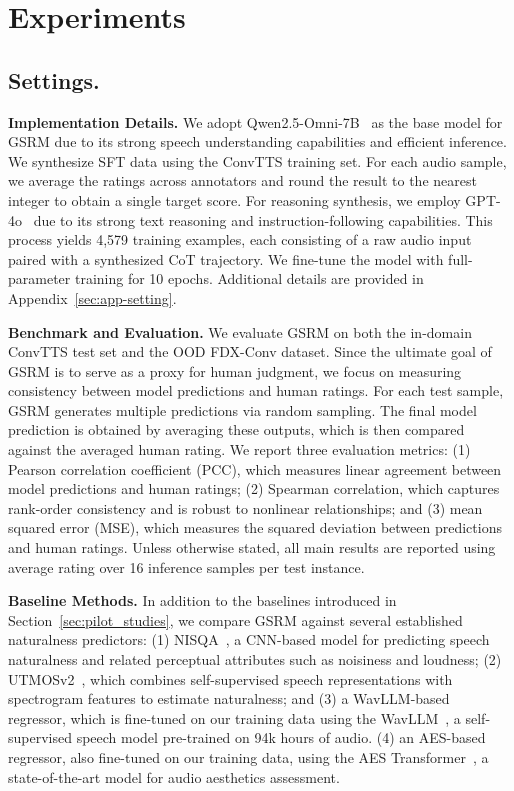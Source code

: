 \section{Experiments} 

\subsection{Settings.} \label{sec:exp_setting}
\textbf{Implementation Details.} We adopt Qwen2.5-Omni-7B~\cite{xu2025qwen2} as the base model for GSRM due to its strong speech understanding capabilities and efficient inference. We synthesize SFT data using the ConvTTS training set. For each audio sample, we average the ratings across annotators and round the result to the nearest integer to obtain a single target score. For reasoning synthesis, we employ GPT-4o~\cite{hurst2024gpt} due to its strong text reasoning and instruction-following capabilities. This process yields 4,579 training examples, each consisting of a raw audio input paired with a synthesized CoT trajectory. We fine-tune the model with full-parameter training for 10 epochs. Additional details are provided in Appendix~\ref{sec:app-setting}.


\textbf{Benchmark and Evaluation.} We evaluate GSRM on both the in-domain ConvTTS test set and the OOD FDX-Conv dataset. Since the ultimate goal of GSRM is to serve as a proxy for human judgment, we focus on measuring consistency between model predictions and human ratings. For each test sample, GSRM generates multiple predictions via random sampling. The final model prediction is obtained by averaging these outputs, which is then compared against the averaged human rating. We report three evaluation metrics: (1) Pearson correlation coefficient (PCC), which measures linear agreement between model predictions and human ratings; (2) Spearman correlation, which captures rank-order consistency and is robust to nonlinear relationships; and (3) mean squared error (MSE), which measures the squared deviation between predictions and human ratings. Unless otherwise stated, all main results are reported using average rating over 16 inference samples per test instance.

\textbf{Baseline Methods.}
In addition to the baselines introduced in Section~\ref{sec:pilot_studies}, we compare GSRM against several established naturalness predictors: (1) NISQA~\cite{mittag2021nisqa}, a CNN-based model for predicting speech naturalness and related perceptual attributes such as noisiness and loudness; (2) UTMOSv2~\cite{baba2024utmosv2}, which combines self-supervised speech representations with spectrogram features to estimate naturalness; and (3) a WavLLM-based regressor, which is fine-tuned on our training data using the WavLLM~\cite{hu2024wavllm}, a self-supervised speech model pre-trained on 94k hours of audio. (4) an AES-based regressor, also fine-tuned on our training data, using the AES Transformer~\cite{tjandra2025meta}, a state-of-the-art model for audio aesthetics assessment.

